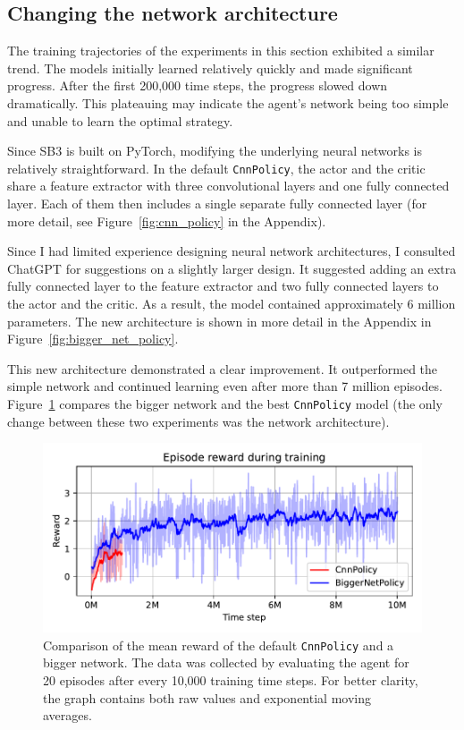 \documentclass[
  digital,     %
  oneside,     %
  nosansbold,  %
  nocolorbold, %
  lof,         %
  lot,         %
]{fithesis4}
\begin{document}
\subsection{Changing the network architecture}
\label{subsec:arch_change}

The training trajectories of the experiments in this section exhibited a similar trend. The models initially learned relatively quickly and made significant progress. After the first 200,000 time steps, the progress slowed down dramatically. This plateauing may indicate the agent's network being too simple and unable to learn the optimal strategy.

Since SB3 is built on PyTorch, modifying the underlying neural networks is relatively straightforward. In the default \texttt{CnnPolicy}, the actor and the critic share a feature extractor with three convolutional layers and one fully connected layer. Each of them then includes a single separate fully connected layer (for more detail, see Figure~\ref{fig:cnn_policy} in the Appendix).

Since I had limited experience designing neural network architectures, I consulted ChatGPT for suggestions on a slightly larger design. It suggested adding an extra fully connected layer to the feature extractor and two fully connected layers to the actor and the critic. As a result, the model contained approximately 6 million parameters. The new architecture is shown in more detail in the Appendix in Figure~\ref{fig:bigger_net_policy}.

This new architecture demonstrated a clear improvement. It outperformed the simple network and continued learning even after more than 7 million episodes. Figure~\ref{fig:v3_bigger_net} compares the bigger network and the best \texttt{CnnPolicy} model (the only change between these two experiments was the network architecture).

\begin{figure}
    \includegraphics[width=1\linewidth]{graphs/v3_cnn_vs_biggernet.pdf}
    \caption{Comparison of the mean reward of the default \texttt{CnnPolicy} and a bigger network. The data was collected by evaluating the agent for 20 episodes after every 10,000 training time steps. For better clarity, the graph contains both raw values and exponential moving averages.}
    \label{fig:v3_bigger_net}
\end{figure}
\end{document}
